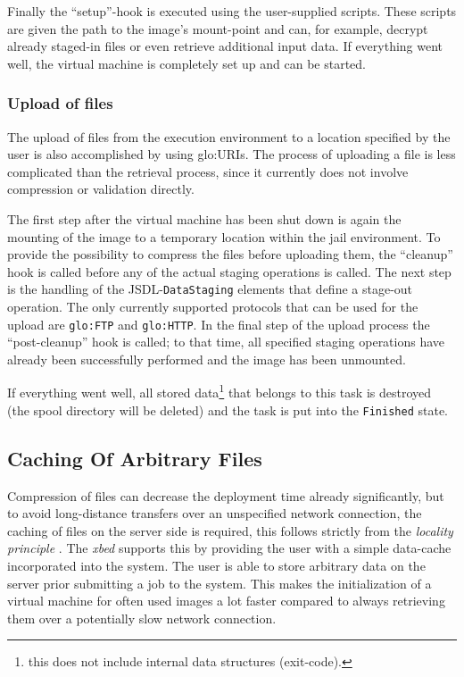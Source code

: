 Finally   the   ``setup''-hook  is   executed   using  the   user-supplied
scripts. These scripts  are given the path to  the image's mount-point and
can,  for  example,  decrypt  already  staged-in files  or  even  retrieve
additional input  data. If  everything went well,  the virtual  machine is
completely set up and can be started.

\subsubsection{Upload of files}

The upload of files from the execution environment to a location specified
by the user  is also accomplished by using  \gls{glo:URI}s. The process of
uploading a file is less  complicated than the retrieval process, since it
currently does  not involve compression or validation  directly.

The first step  after the virtual machine has been shut  down is again the
mounting of the image to a temporary location within the jail environment.
To provide  the possibility to  compress the files before  uploading them,
the ``cleanup'' hook is called before any of the actual staging operations
is called. The next step  is the handling of the JSDL-\texttt{DataStaging}
elements that  define a stage-out operation. The  only currently supported
protocols that can  be used for the upload  are \texttt{\gls{glo:FTP}} and
\texttt{\gls{glo:HTTP}}.  In the  final  step of  the  upload process  the
``post-cleanup''  hook is  called;  to that  time,  all specified  staging
operations have already been successfully performed and the image has been
unmounted.

If everything  went well, all  stored data\footnote{this does  not include
  internal data structures (\eg exit-code).}  that belongs to this task is
destroyed (\ie  the spool directory will  be deleted) and the  task is put
into the \texttt{Finished} state.

\subsection{Caching Of Arbitrary Files}
\label{sec:caching}

Compression   of  files   can   decrease  the   deployment  time   already
significantly, but  to avoid  long-distance transfers over  an unspecified
network connection, the  caching of files on the  server side is required,
this    follows    strictly    from    the    \emph{locality    principle}
\cite{locality-principle}.  The \emph{xbed} supports this by providing the
user with a  simple data-cache incorporated into the  system.  The user is
able to store  arbitrary data on the server prior submitting  a job to the
system. This makes the initialization  of a virtual machine for often used
images a lot faster compared  to always retrieving them over a potentially
slow network connection.

